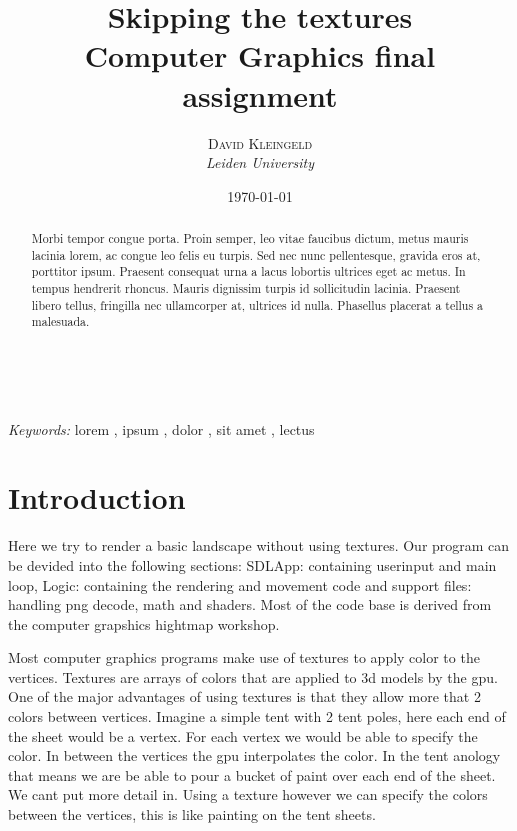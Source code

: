 \documentclass[a4paper, 11pt]{article} %
\title{\textbf{Skipping the textures}\\ %
Computer Graphics final assignment} %
\author{\textsc{David Kleingeld} %
\\{\textit{Leiden University}}} %
\date{\today} %
\makeatletter
\renewcommand{\maketitle}{ %
\begin{flushright} %
{\LARGE\@title} %

\vspace{50pt} %

{\large\@author} %
\\\@date %

\vspace{40pt} %
\end{flushright}
}
\makeatother
\begin{document}
\maketitle %



\begin{abstract}
Morbi tempor congue porta. Proin semper, leo vitae faucibus dictum, metus mauris lacinia lorem, ac congue leo felis eu turpis. Sed nec nunc pellentesque, gravida eros at, porttitor ipsum. Praesent consequat urna a lacus lobortis ultrices eget ac metus. In tempus hendrerit rhoncus. Mauris dignissim turpis id sollicitudin lacinia. Praesent libero tellus, fringilla nec ullamcorper at, ultrices id nulla. Phasellus placerat a tellus a malesuada.
\end{abstract}

\hspace*{3,6mm}\textit{Keywords:} lorem , ipsum , dolor , sit amet , lectus %

\vspace{30pt} %


\section*{Introduction}
Here we try to render a basic landscape without using textures. Our program can be devided into the following sections: SDLApp: containing userinput and main loop, Logic: containing the rendering and movement code and support files: handling png decode, math and shaders. Most of the code base is derived from the computer grapshics hightmap workshop.

Most computer graphics programs make use of textures to apply color to the vertices. Textures are arrays of colors that are applied to 3d models by the gpu. One of the major advantages of using textures is that they allow more that 2 colors between vertices. Imagine a simple tent with 2 tent poles, here each end of the sheet would be a vertex. For each vertex we would be able to specify the color. In between the vertices the gpu interpolates the color. In the tent anology that means we are be able to pour a bucket of paint over each end of the sheet. We cant put more detail in. Using a texture however we can specify the colors between the vertices, this is like painting on the tent sheets.
\end{document}
